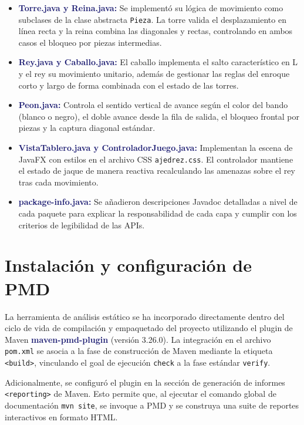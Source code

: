 \documentclass[12pt,a4paper]{article}
\newcommand{\key}[1]{\textbf{\textcolor{MidnightBlue}{#1}}}
\begin{document}
\begin{itemize}
    \item \key{Torre.java y Reina.java:} Se implementó su lógica de movimiento como subclases de la clase abstracta \texttt{Pieza}. La torre valida el desplazamiento en línea recta y la reina combina las diagonales y rectas, controlando en ambos casos el bloqueo por piezas intermedias.
    \item \key{Rey.java y Caballo.java:} El caballo implementa el salto característico en L y el rey su movimiento unitario, además de gestionar las reglas del enroque corto y largo de forma combinada con el estado de las torres.
    \item \key{Peon.java:} Controla el sentido vertical de avance según el color del bando (blanco o negro), el doble avance desde la fila de salida, el bloqueo frontal por piezas y la captura diagonal estándar.
    \item \key{VistaTablero.java y ControladorJuego.java:} Implementan la escena de JavaFX con estilos en el archivo CSS \texttt{ajedrez.css}. El controlador mantiene el estado de jaque de manera reactiva recalculando las amenazas sobre el rey tras cada movimiento.
    \item \key{package-info.java:} Se añadieron descripciones Javadoc detalladas a nivel de cada paquete para explicar la responsabilidad de cada capa y cumplir con los criterios de legibilidad de las APIs.
\end{itemize}

\section{Instalación y configuración de PMD}

La herramienta de análisis estático se ha incorporado directamente dentro del ciclo de vida de compilación y empaquetado del proyecto utilizando el plugin de Maven \key{maven-pmd-plugin} (versión 3.26.0). La integración en el archivo \texttt{pom.xml} se asocia a la fase de construcción de Maven mediante la etiqueta \texttt{<build>}, vinculando el goal de ejecución \texttt{check} a la fase estándar \texttt{verify}. 

Adicionalmente, se configuró el plugin en la sección de generación de informes \texttt{<reporting>} de Maven. Esto permite que, al ejecutar el comando global de documentación \texttt{mvn site}, se invoque a PMD y se construya una suite de reportes interactivos en formato HTML.
\end{document}
